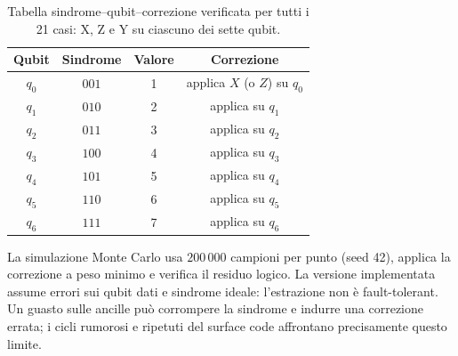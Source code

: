 \begin{onehalfspace}
\begin{table}[H]
\centering
\begin{tabular}{cccc}
\toprule
\textbf{Qubit} & \textbf{Sindrome} & \textbf{Valore} & \textbf{Correzione} \\
\midrule
$q_0$ & $001$ & 1 & applica $X$ (o $Z$) su $q_0$ \\
\addlinespace[0.3em]
$q_1$ & $010$ & 2 & applica su $q_1$ \\
\addlinespace[0.3em]
$q_2$ & $011$ & 3 & applica su $q_2$ \\
\addlinespace[0.3em]
$q_3$ & $100$ & 4 & applica su $q_3$ \\
\addlinespace[0.3em]
$q_4$ & $101$ & 5 & applica su $q_4$ \\
\addlinespace[0.3em]
$q_5$ & $110$ & 6 & applica su $q_5$ \\
\addlinespace[0.3em]
$q_6$ & $111$ & 7 & applica su $q_6$ \\
\bottomrule
\end{tabular}
\caption[Syndrome table del codice di Steane]{Tabella
sindrome--qubit--correzione verificata per tutti i 21 casi: X, Z e Y su
ciascuno dei sette qubit.}\label{tab:steane_sindrome}

\end{table}

La simulazione Monte Carlo usa $200\,000$ campioni per punto (seed 42),
applica la correzione a peso minimo e verifica il residuo logico. La
versione implementata assume errori sui qubit dati e sindrome ideale:
l'estrazione non è fault-tolerant. Un guasto sulle ancille può corrompere
la sindrome e indurre una correzione errata; i cicli rumorosi e ripetuti
del surface code affrontano precisamente questo limite.

\end{onehalfspace}



